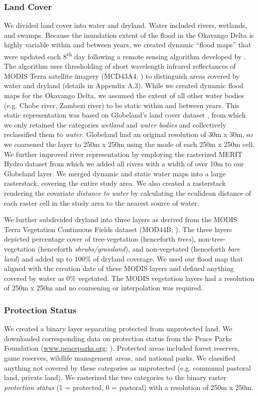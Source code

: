 \documentclass[abstract=on,10pt,a4paper,bibliography=totocnumbered]{article}
\begin{document}
\subsubsection{Land Cover}
We divided land cover into water and dryland. Water included rivers, wetlands,
and swamps. Because the inundation extent of the flood in the Okavango Delta is
highly variable within and between years, we created dynamic ``flood maps'' that
were updated each 8\textsuperscript{th} day following a remote sensing algorithm
developed by \citep{Wolski.2017}. The algorithm uses thresholding of short
wavelength infrared reflectances of MODIS Terra satellite imagery (MCD43A4;
\citealp{Schaaf.2015}) to distinguish areas covered by water and dryland
(details in Appendix A.3). While we created dynamic flood maps for the Okavango
Delta, we assumed the extent of all other water bodies (e.g. Chobe river,
Zambezi river) to be static within and between years. This static representation
was based on Globeland's land cover dataset \citep{Chen.2015}, from which we
only retained the categories \textit{wetland} and \textit{water bodies} and
collectively reclassified them to \textit{water}. Globeland had an original
resolution of 30m x 30m, so we coarsened the layer to 250m x 250m using the mode
of each 250m x 250m cell. We further improved river representation by employing
the rasterized MERIT Hydro dataset \citep{Yamazaki.2019} from which we added all
rivers with a width of over 10m to our Globeland layer. We merged dynamic and
static water maps into a large rasterstack, covering the entire study area. We
also created a rasterstack rendering the covariate \textit{distance to water} by
calculating the eculidean distance of each raster cell in the study area to the
nearest source of water.

We further subdivided dryland into three layers as derived from the MODIS Terra
Vegetation Continuous Fields dataset (MOD44B; \citealp{Dimiceli.2015}). The
three layers depicted percentage cover of tree-vegetation (henceforth
\textit{trees}), non-tree-vegetation (henceforth \textit{shrubs/grassland}), and
non-vegetated (henceforth \textit{bare land}) and added up to 100\% of dryland
coverage. We used our flood map that aligned with the creation date of these
MODIS layers and defined anything covered by water as 0\% vegetated. The MODIS
vegetation layers had a resolution of 250m x 250m and no coarsening or
interpolation was required.

\subsubsection{Protection Status}
We created a binary layer separating protected from unprotected land. We
downloaded corresponding data on protection status from the Peace Parks
Foundation (\url{www.peaceparks.org}; \citealp{PeaceParks.2019}). Protected
areas included forest reserves, game reserves, wildlife management areas, and
national parks. We classified anything not covered by these categories as
unprotected (e.g. communal pastoral land, private land). We rasterized the two
categories to the binary raster \textit{protection status} (1 = protected, 0 =
pastoral) with a resolution of 250m x 250m.
\end{document}
